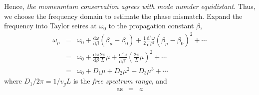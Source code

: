 \documentclass[final]{kuee_en}
\newcommand{\mathd}{\mathrm{d}}
\newcommand{\tmop}[1]{\ensuremath{\operatorname{#1}}}
\newcommand{\tmtextit}[1]{{\itshape{#1}}}
\begin{document}
Hence, \tmtextit{the momenmtum conservation agrees with mode numder
equidistant.} Thus, we choose the frequency domain to estimate the phase
mismatch. Expand the frequency into Taylor seires at $\omega_0$ to the
propagation constant $\beta$,
\begin{eqnarray}
  \omega_{\mu} & = & \omega_0 + \frac{\mathd \omega}{\mathd \beta}
  (\beta_{\mu} - \beta_0) + \frac{1}{2}  \frac{\mathd^2 \omega}{\mathd
  \beta^2} (\beta_{\mu} - \beta_0)^2 + \cdots \\
  & = & \omega_0 + \frac{\mathd \omega}{\mathd \beta} \frac{2 \pi}{L} \mu +
  \frac{\mathd^2 \omega}{\mathd \beta^2} \left( \frac{2 \pi}{L} \mu \right)^2
  + \cdots \nonumber\\
  & = & \omega_0 + D_1 \mu + D_2 \mu^2 + D_3 \mu^3 + \cdots \nonumber
\end{eqnarray}
where $D_1 / 2 \pi = 1 / v_g L$ is the \tmtextit{free spectrum range}, and
\begin{eqnarray*}
  \tmop{as} & = & a
\end{eqnarray*}



\end{document}
